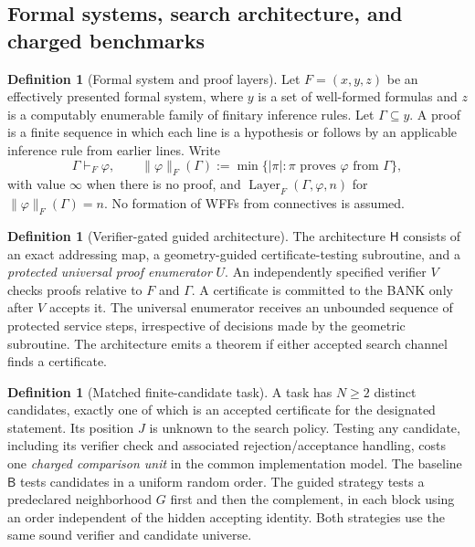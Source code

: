 \documentclass[11pt,letterpaper]{article}
\theoremstyle{definition}
\newtheorem{definition}[theorem]{Definition}
\theoremstyle{remark}
\newcommand{\Layer}{\operatorname{Layer}}
\newcommand{\Hsys}{\mathsf H}
\newcommand{\Bsys}{\mathsf B}
\begin{document}
\subsection{Formal systems, search architecture, and charged benchmarks}
\begin{definition}[Formal system and proof layers]
Let $F=(x,y,z)$ be an effectively presented formal system, where $y$ is a set of well-formed formulas and $z$ is a computably enumerable family of finitary inference rules. Let $\Gamma\subseteq y$. A proof is a finite sequence in which each line is a hypothesis or follows by an applicable inference rule from earlier lines. Write
\[
 \Gamma\vdash_F\varphi,\qquad
 \|\varphi\|_F(\Gamma):=\min\{|\pi|:\pi\text{ proves }\varphi\text{ from }\Gamma\},
\]
with value $\infty$ when there is no proof, and
$\Layer_F(\Gamma,\varphi,n)$ for $\|\varphi\|_F(\Gamma)=n$.
No formation of WFFs from connectives is assumed.
\end{definition}

\begin{definition}[Verifier-gated guided architecture]
The architecture $\Hsys$ consists of an exact addressing map, a geometry-guided certificate-testing subroutine, and a \emph{protected universal proof enumerator} $U$. An independently specified verifier $V$ checks proofs relative to $F$ and $\Gamma$. A certificate is committed to the BANK only after $V$ accepts it. The universal enumerator receives an unbounded sequence of protected service steps, irrespective of decisions made by the geometric subroutine. The architecture emits a theorem if either accepted search channel finds a certificate.
\end{definition}

\begin{definition}[Matched finite-candidate task]
A task has $N\ge 2$ distinct candidates, exactly one of which is an accepted certificate for the designated statement. Its position $J$ is unknown to the search policy. Testing any candidate, including its verifier check and associated rejection/acceptance handling, costs one \emph{charged comparison unit} in the common implementation model. The baseline $\Bsys$ tests candidates in a uniform random order. The guided strategy tests a predeclared neighborhood $G$ first and then the complement, in each block using an order independent of the hidden accepting identity. Both strategies use the same sound verifier and candidate universe.
\end{definition}
\end{document}
